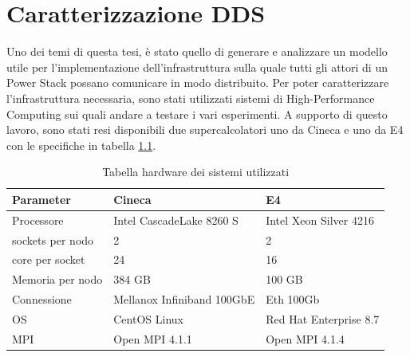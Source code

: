 \chapter{Caratterizzazione DDS}
Uno dei temi di questa tesi, è stato quello di generare e  analizzare un modello utile per l'implementazione dell'infrastruttura sulla quale tutti gli attori di un Power Stack possano comunicare in modo distribuito. Per poter caratterizzare  l'infrastruttura necessaria, sono stati utilizzati sistemi di High-Performance Computing sui quali andare a testare i vari esperimenti. A supporto di questo lavoro, sono stati resi disponibili due supercalcolatori uno da Cineca\cite{Cineca} e uno da E4\cite{E4} con le specifiche in tabella \ref{table:hpc-cineca}.

\begin{table}[H]
\begin{center}
\begin{tabular}{l|l|l}
    \hline
    \textbf{Parameter} & \textbf{Cineca} & \textbf{E4} \\
    \hline
    Processore & Intel CascadeLake 8260 S & Intel Xeon Silver 4216 \\
    \hline
    [\#] sockets per nodo & 2 & 2 \\
    \hline
    [\#]  core per socket & 24 & 16 \\
    \hline
    Memoria per nodo & 384 GB & 100 GB\\
    \hline
    Connessione & Mellanox Infiniband 100GbE & Eth 100Gb\\
    \hline
    OS & CentOS Linux &  Red Hat Enterprise 8.7\\ 
    \hline
    MPI & Open MPI 4.1.1 & Open MPI 4.1.4 \\
    \hline
\end{tabular}
\end{center}
\caption{Tabella hardware dei sistemi utilizzati}
\label{table:hpc-cineca}
\end{table}


